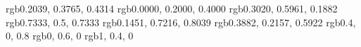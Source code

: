
\makeatletter



\newcommand{\customtoday}{\the\year/\two@digits{\the\month}/\two@digits{\the\day}}
\newcommand{\customdate}{\customtoday\ \currenttime\ (\jadayofweek{\the\year}{\the\month}{\the\day})}
\newcommand{\customtodayap}{\ifnum\currenthour<12 \customtoday\,a.m.\else\customtoday\,p.m.\fi}
\newif\if@backmatter%
\newif\if@frontmatter%
\newif\if@appendix%
\setlength{\kanjiskip}{0.0pt plus 0.4pt minus 0.5pt}
\setlength{\xkanjiskip}{2.40555pt plus 1.0pt minus 1.0pt}
\newcommand{\hk}{\hspace{\kanjiskip}} %
\newcommand{\hx}{\hspace{\xkanjiskip}} %
\newcommand\cdotfill{%
  \leaders\hbox{$\m@th\mkern\@dotsep mu\hbox{$\cdot$}\mkern \@dotsep mu$}\hfill\kern\z@
}
\definecolor{ai}     {rgb}{0.2039, 0.3765, 0.4314}
\definecolor{kon}    {rgb}{0.0000, 0.2000, 0.4000}
\definecolor{moegi}  {rgb}{0.3020, 0.5961, 0.1882}
\definecolor{sssec}  {rgb}{0.7333, 0.5, 0.7333}
\definecolor{sora}   {rgb}{0.1451, 0.7216, 0.8039}
\definecolor{sumire} {rgb}{0.3882, 0.2157, 0.5922}
\definecolor{wwqqcc} {rgb}{0.4, 0, 0.8}
\definecolor{qqzzqq} {rgb}{0, 0.6, 0}
\definecolor{ffwwqq} {rgb}{1, 0.4, 0}
